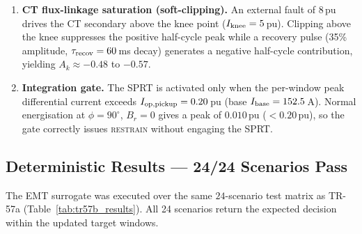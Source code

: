 \documentclass[11pt, a4paper]{article}
\newcommand{\Ak}{A_k}
\begin{document}
\begin{enumerate}
  \item \textbf{CT flux-linkage saturation (soft-clipping).}  An external
    fault of $8\,$pu drives the CT secondary above the knee point
    ($I_{\rm knee} = 5\,$pu).  Clipping above the knee suppresses the
    positive half-cycle peak while a recovery pulse (35\% amplitude,
    $\tau_{\rm recov} = 60\,$ms decay) generates a negative half-cycle
    contribution, yielding $\Ak \approx -0.48$ to $-0.57$.

  \item \textbf{Integration gate.}  The SPRT is activated only when the
    per-window peak differential current exceeds $I_{\rm op,pickup} =
    0.20\,$pu (base $I_{\rm base} = 152.5\,$A).  Normal energisation at
    $\phi = 90^\circ$, $B_r = 0$ gives a peak of $0.010\,$pu
    ($< 0.20\,$pu), so the gate correctly issues \textsc{restrain} without
    engaging the SPRT.
\end{enumerate}

\subsection{Deterministic Results — 24/24 Scenarios Pass}

The EMT surrogate was executed over the same $24$-scenario test matrix as
TR-57a (Table~\ref{tab:tr57b_results}).  All 24 scenarios return the
expected decision within the updated target windows.
\end{document}
